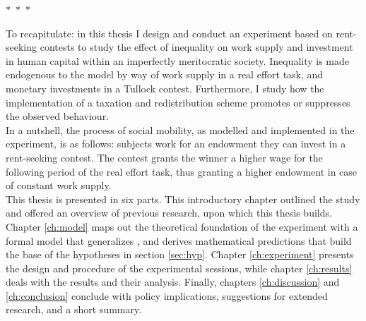 \begin{center}
  $\ast$~$\ast$~$\ast$
\end{center}

To recapitulate: in this thesis I design and conduct an experiment based on rent-seeking contests to study the effect of inequality on work supply and investment in human capital within an imperfectly meritocratic society. Inequality is made endogenous to the model by way of work supply in a real effort task, and monetary investments in a Tullock contest.  Furthermore, I study how the implementation of a taxation and redistribution scheme promotes or suppresses the observed behaviour.\\

In a nutshell, the process of social mobility, as modelled and implemented in the experiment, is as follows: subjects work for an endowment they can invest in a rent-seeking contest. The contest grants the winner a higher wage for the following period of the real effort task, thus granting a higher endowment in case of constant work supply.\\

This thesis is presented in six parts. This introductory chapter outlined the study and offered an overview of previous research, upon which this thesis builds. Chapter \ref{ch:model} maps out the theoretical foundation of the experiment with a formal model that generalizes \cite{koch2017}, and derives mathematical predictions that build the base of the hypotheses in section \ref{sec:hyp}. Chapter \ref{ch:experiment} presents the design and procedure of the experimental sessions, while chapter \ref{ch:results} deals with the results and their analysis. Finally, chapters \ref{ch:discussion} and \ref{ch:conclusion} conclude with policy implications, suggestions for extended research, and a short summary.